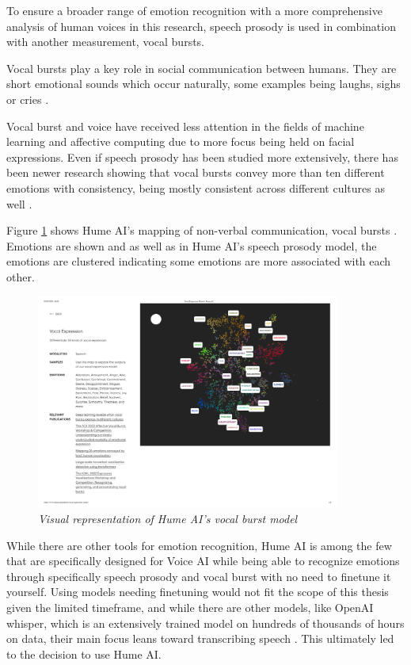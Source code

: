 To ensure a broader range of emotion recognition with a more comprehensive analysis of human voices in this research, speech prosody is used in combination with another measurement, vocal bursts.

Vocal bursts play a key role in social communication between humans. They are short emotional sounds which occur naturally, some examples being laughs, sighs or cries \autocite{Brooks2023}.

Vocal burst and voice have received less attention in the fields of machine learning and affective computing due to more focus being held on facial expressions. Even if speech prosody has been studied more extensively, there has been newer research showing that vocal bursts convey more than ten different emotions with consistency, being mostly consistent across different cultures as well \autocite{Baird2022}.

Figure \ref{fig:hume-ai-vocal-burst} shows Hume AI’s mapping of non-verbal communication, vocal bursts \autocite{HumeAIVocalExpression}. Emotions are shown and as well as in Hume AI’s speech prosody model, the emotions are clustered indicating some emotions are more associated with each other.

\begin{figure}[ht]
    \centering
    \includegraphics[width=10cm]{png/theoretical/hume-vocal.pdf}
    \caption{\textit{Visual representation of Hume AI’s vocal burst model} \autocite{HumeAIVocalExpression}}
    \label{fig:hume-ai-vocal-burst}
\end{figure}

While there are other tools for emotion recognition, Hume AI is among the few that are specifically designed for Voice AI while being able to recognize emotions through specifically speech prosody and vocal burst with no need to finetune it yourself. 
Using models needing finetuning would not fit the scope of this thesis given the limited timeframe, and while there are other models, like OpenAI whisper, which is an extensively trained model on hundreds of thousands of hours on data, their main focus leans toward transcribing speech \autocite{OpenAI2022}. This ultimately led to the decision to use Hume AI.

